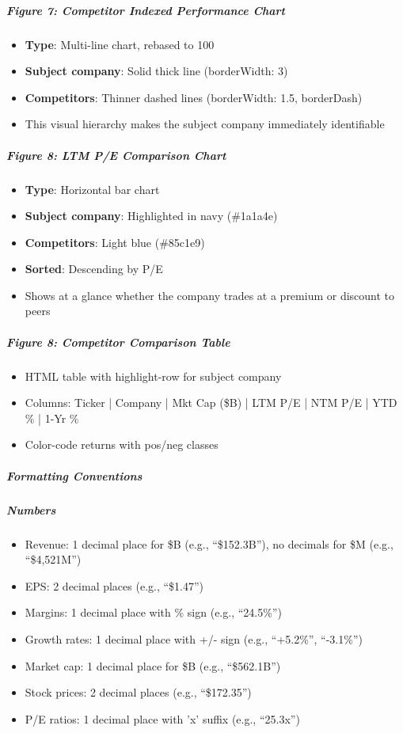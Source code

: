 \documentclass[11pt]{article}
\begin{document}
\subparagraph{Figure 7: Competitor Indexed Performance Chart}\mbox{}\par
\begin{itemize}[leftmargin=*,itemsep=2pt,topsep=2pt]
\item {} \textbf{Type}: Multi-line chart, rebased to 100
\item {} \textbf{Subject company}: Solid thick line (borderWidth: 3)
\item {} \textbf{Competitors}: Thinner dashed lines (borderWidth: 1.5, borderDash)
\item {} This visual hierarchy makes the subject company immediately identifiable
\end{itemize}

\subparagraph{Figure 8: LTM P/E Comparison Chart}\mbox{}\par
\begin{itemize}[leftmargin=*,itemsep=2pt,topsep=2pt]
\item {} \textbf{Type}: Horizontal bar chart
\item {} \textbf{Subject company}: Highlighted in navy (\#1a1a4e)
\item {} \textbf{Competitors}: Light blue (\#85c1e9)
\item {} \textbf{Sorted}: Descending by P/E
\item {} Shows at a glance whether the company trades at a premium or discount to peers
\end{itemize}

\subparagraph{Figure 8: Competitor Comparison Table}\mbox{}\par
\begin{itemize}[leftmargin=*,itemsep=2pt,topsep=2pt]
\item {} HTML table with highlight-row for subject company
\item {} Columns: Ticker | Company | Mkt Cap (\$B) | LTM P/E | NTM P/E | YTD \% | 1-Yr \%
\item {} Color-code returns with pos/neg classes
\end{itemize}

\subparagraph{Formatting Conventions}\mbox{}\par

\subparagraph{Numbers}\mbox{}\par
\begin{itemize}[leftmargin=*,itemsep=2pt,topsep=2pt]
\item {} Revenue: 1 decimal place for \$B (e.g., ``\$152.3B''), no decimals for \$M (e.g., ``\$4,521M'')
\item {} EPS: 2 decimal places (e.g., ``\$1.47'')
\item {} Margins: 1 decimal place with \% sign (e.g., ``24.5\%'')
\item {} Growth rates: 1 decimal place with +/- sign (e.g., ``+5.2\%'', ``-3.1\%'')
\item {} Market cap: 1 decimal place for \$B (e.g., ``\$562.1B'')
\item {} Stock prices: 2 decimal places (e.g., ``\$172.35'')
\item {} P/E ratios: 1 decimal place with 'x' suffix (e.g., ``25.3x'')
\end{itemize}
\end{document}
